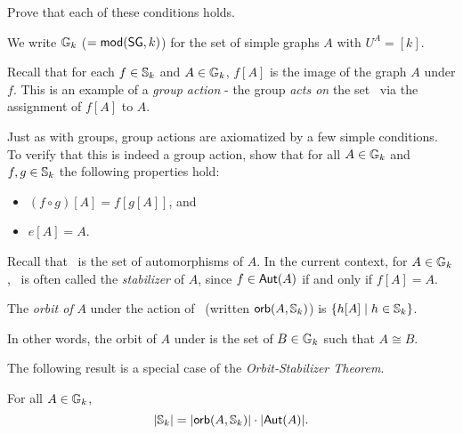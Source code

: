 \begin{aside}
Prove that each of these conditions holds. 
\end{aside}

\begin{definition}
We write $\mbox{$\mathbb{G}_{k}$}$ ($=\mbox{$\mathsf{mod}(\mbox{$\mathsf{SG}$},k)$}$) for the set of simple graphs $A$ with $U^A = [k]$.
\end{definition}
\iffalse
\begin{definition}
For each $f\in\symn{k}$ and $A\in\sgraphn{k}$, we define $f[A]$ (called the \emph{image of the graph $A$ under $f$}) to be the graph with universe $[k]$ and edge-set
\[
    L^{f[A]} := \{\op{f(i)}{f(j)} \mid \op{i}{j} \in L^A\}
\]
Note that $f$ is an isomorphism of $A$ onto $f[A]$.
\end{definition}
\fi
Recall that for each $f\in\symn{k}$ and $A\in\sgraphn{k}$, $f[A]$ is the image of the graph $A$ under $f$.
This is an example of a \emph{group action} - the group  \emph{acts on} the set \ via the assignment of $f[A]$ to $A$. 

\begin{aside}
    Just as with groups, group actions are axiomatized by a few simple conditions. To verify that this is indeed a group action, show that for all $A\in\sgraphn{k}$ and $f,g\in\mbox{$\mathbb{S}_{k}$}$ the following properties hold:
    \begin{itemize}
    \item
    $(f\circ g)[A]=f[g[A]]$, and 
    \item
    $e[A]=A$.
    \end{itemize}    
\end{aside}


Recall that \ is the set of automorphisms of $A$. In the current context, for $A\in \sgraphn{k}$, \ is often called the \emph{stabilizer} of $A$, since $f\in\mbox{$\mathsf{Aut}(A)$}$ if and only if $f[A] =A$. 

\begin{definition}
The \emph{orbit of} $A$  under the action of \ (written $\mbox{$\mathsf{orb}(A,\mbox{$\mathbb{S}_{k}$})$}$) is $\{h[A]\mid h\in\mbox{$\mathbb{S}_{k}$}\}$. 

In other words, the orbit of $A$ under  is the set of $B\in\mbox{$\mathbb{G}_{k}$}$ such  that $A\cong B$. \end{definition}

The following result is a special case of the \emph{Orbit-Stabilizer Theorem}.
\begin{theorem}\label{orb-stab-thm}
For all $A\in\sgraphn{k}$,
\[
\mbox{$|\mbox{$\mathbb{S}_{k}$}|$}=\mbox{$|\mbox{$\mathsf{orb}(A,\mbox{$\mathbb{S}_{k}$})$}|$}\cdot\mbox{$|\mbox{$\mathsf{Aut}(A)$}|$}.
\]
\end{theorem}

